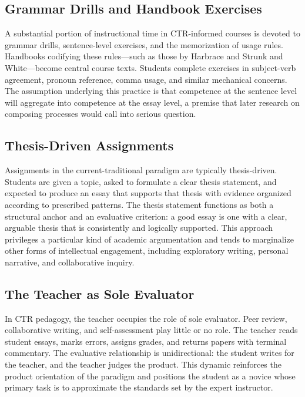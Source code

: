 \documentclass[12pt]{article}
\begin{document}
\subsection{Grammar Drills and Handbook Exercises}

A substantial portion of instructional time in CTR-informed courses is devoted to grammar drills, sentence-level exercises, and the memorization of usage rules. Handbooks codifying these rules---such as those by Harbrace and Strunk and White---become central course texts. Students complete exercises in subject-verb agreement, pronoun reference, comma usage, and similar mechanical concerns. The assumption underlying this practice is that competence at the sentence level will aggregate into competence at the essay level, a premise that later research on composing processes would call into serious question.

\subsection{Thesis-Driven Assignments}

Assignments in the current-traditional paradigm are typically thesis-driven. Students are given a topic, asked to formulate a clear thesis statement, and expected to produce an essay that supports that thesis with evidence organized according to prescribed patterns. The thesis statement functions as both a structural anchor and an evaluative criterion: a good essay is one with a clear, arguable thesis that is consistently and logically supported. This approach privileges a particular kind of academic argumentation and tends to marginalize other forms of intellectual engagement, including exploratory writing, personal narrative, and collaborative inquiry.

\subsection{The Teacher as Sole Evaluator}

In CTR pedagogy, the teacher occupies the role of sole evaluator. Peer review, collaborative writing, and self-assessment play little or no role. The teacher reads student essays, marks errors, assigns grades, and returns papers with terminal commentary. The evaluative relationship is unidirectional: the student writes for the teacher, and the teacher judges the product. This dynamic reinforces the product orientation of the paradigm and positions the student as a novice whose primary task is to approximate the standards set by the expert instructor.
\end{document}
